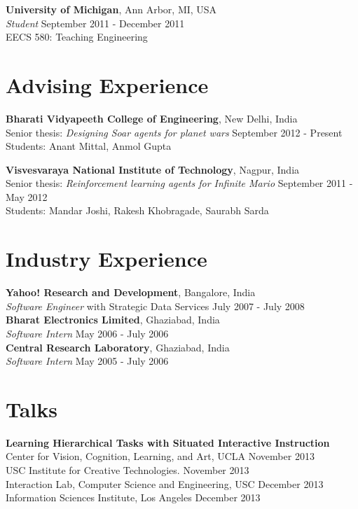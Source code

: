 \documentclass[margin,line,11pt]{res}
\begin{document}
\begin{resume}
                  \textbf{University of Michigan}, Ann Arbor, MI, USA \\
                  \emph{Student}  \hfill September 2011 - December 2011\\
                  EECS 580: Teaching Engineering

                  \section{\sc Advising Experience}
                  \textbf{Bharati Vidyapeeth College of Engineering}, New Delhi, India\\
                  Senior thesis: \emph{Designing Soar agents for planet wars} \hfill September 2012 - Present\\
                  Students: Anant Mittal, Anmol Gupta

                  \textbf{Visvesvaraya National Institute of Technology}, Nagpur, India\\
                  Senior thesis: \emph{Reinforcement learning agents for Infinite Mario} \hfill September 2011 - May 2012\\
                  Students: Mandar Joshi, Rakesh Khobragade, Saurabh Sarda\\

                  \section{\sc Industry Experience}
                          {\bf Yahoo! Research and Development}, Bangalore, India \\
                          \emph{Software Engineer} with Strategic Data Services \hfill July 2007 - July 2008\\
                               {\bf Bharat Electronics Limited}, Ghaziabad, India \\
                               \emph{Software Intern} \hfill May 2006 - July 2006\\
                                    {\bf Central Research Laboratory}, Ghaziabad, India \\
                                    \emph{Software Intern} \hfill May 2005 - July 2006 

                                    \section{\sc Talks}
                                    \textbf{Learning Hierarchical Tasks with Situated Interactive Instruction}\\
                                    Center for Vision, Cognition, Learning, and Art, UCLA \hfill November 2013\\
                                    USC Institute for Creative Technologies. \hfill November 2013\\
                                    Interaction Lab, Computer Science and Engineering, USC \hfill December 2013\\
                                    Information Sciences Institute, Los Angeles \hfill December 2013


\end{resume}
\end{document}
